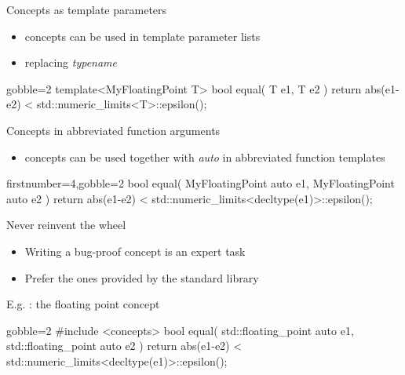 \begin{frame}[fragile]
    \begin{block}{Concepts as template parameters}
      \begin{itemize}
      \item concepts can be used in template parameter lists
      \item replacing {\it typename}
      \end{itemize}
    \end{block}
    \begin{exampleblock}{}
      \small
      \begin{cppcode*}{gobble=2}
      template<MyFloatingPoint T>
      bool equal( T e1, T e2 ) {
        return abs(e1-e2) < std::numeric_limits<T>::epsilon();
      }
      \end{cppcode*}
    \end{exampleblock}
    \begin{block}{Concepts in abbreviated function arguments}
      \begin{itemize}
        \item concepts can be used together with {\it auto} in abbreviated function templates
      \end{itemize}
    \end{block}
    \begin{exampleblock}{}
      \small
      \begin{cppcode*}{firstnumber=4,gobble=2}
      bool equal( MyFloatingPoint auto e1,
                  MyFloatingPoint auto e2 ) {
        return abs(e1-e2) <
               std::numeric_limits<decltype(e1)>::epsilon(); }
      \end{cppcode*}
    \end{exampleblock}
\end{frame}

\begin{frame}[fragile]
    \begin{block}{Never reinvent the wheel}
      \begin{itemize}
        \item Writing a bug-proof concept is an expert task
        \item Prefer the ones provided by the standard library
      \end{itemize}
    \end{block}
    \begin{exampleblock}{E.g. : the floating point concept}
      \small
      \begin{cppcode*}{gobble=2}
      #include <concepts>
      bool equal( std::floating_point auto e1,
                  std::floating_point auto e2 ) {
        return abs(e1-e2) <
               std::numeric_limits<decltype(e1)>::epsilon();
      }
      \end{cppcode*}
    \end{exampleblock}
\end{frame}

